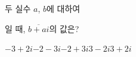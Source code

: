 두 실수 $a$, $b$에 대하여 \par\smallskip{}\par\smallskip\noindent 일 때, $\overline{b+ai}$의 값은? 
\begin{choices32}{$-3+2i$}{$-2-3i$}{$-2+3i$}{$3-2i$}{$3+2i$}\end{choices32}
